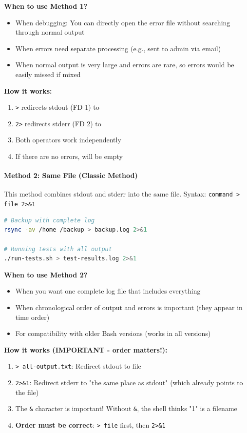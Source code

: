 \textbf{When to use Method 1?}
\begin{itemize}
	\item When debugging: You can directly open the error file without searching through normal output
	\item When errors need separate processing (e.g., sent to admin via email)
	\item When normal output is very large and errors are rare, so errors would be easily missed if mixed
\end{itemize}

\textbf{How it works:}
\begin{enumerate}
	\item \texttt{>} redirects stdout (FD 1) to 
	\item \texttt{2>} redirects stderr (FD 2) to 
	\item Both operators work independently
	\item If there are no errors,  will be empty
\end{enumerate}

\paragraph{Method 2: Same File (Classic Method)}

This method combines stdout and stderr into the same file. Syntax: \texttt{command > file 2>\&1}

\begin{lstlisting}[language=bash, caption={Method 2 example - same file}]
# Backup with complete log
rsync -av /home /backup > backup.log 2>&1

# Running tests with all output
./run-tests.sh > test-results.log 2>&1
\end{lstlisting}

\textbf{When to use Method 2?}
\begin{itemize}
	\item When you want one complete log file that includes everything
	\item When chronological order of output and errors is important (they appear in time order)
	\item For compatibility with older Bash versions (works in all versions)
\end{itemize}

\textbf{How it works (IMPORTANT - order matters!):}
\begin{enumerate}
	\item \texttt{> all-output.txt}: Redirect stdout to file
	\item \texttt{2>\&1}: Redirect stderr to "the same place as stdout" (which already points to the file)
	\item The \texttt{\&} character is important! Without \texttt{\&}, the shell thinks "1" is a filename
	\item \textbf{Order must be correct}: \texttt{> file} first, then \texttt{2>\&1}
\end{enumerate}

